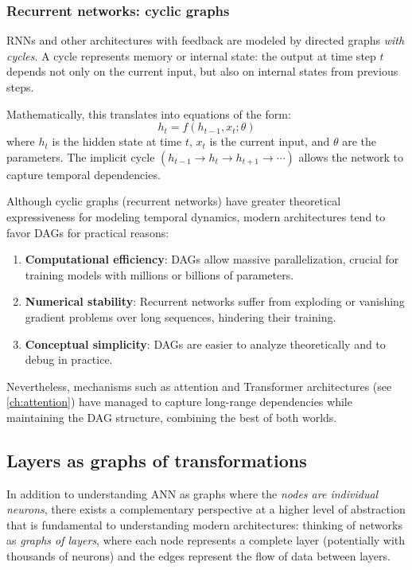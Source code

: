 \subsubsection{Recurrent networks: cyclic graphs}

\glspl{RNN} and other architectures with feedback are modeled by directed graphs \textit{with cycles}. A cycle represents memory or internal state: the output at time step $t$ depends not only on the current input, but also on internal states from previous steps.

Mathematically, this translates into equations of the form:
\[
h_t = f(h_{t-1}, x_t; \theta)
\]
where $h_t$ is the hidden state at time $t$, $x_t$ is the current input, and $\theta$ are the parameters. The implicit cycle $(h_{t-1} \to h_t \to h_{t+1} \to \cdots)$ allows the network to capture temporal dependencies.

Although cyclic graphs (recurrent networks) have greater theoretical expressiveness for modeling temporal dynamics, modern architectures tend to favor \glspl{DAG} for practical reasons:

\begin{enumerate}
    \item \textbf{Computational efficiency}: \glspl{DAG} allow massive parallelization, crucial for training models with millions or billions of parameters.

    \item \textbf{Numerical stability}: Recurrent networks suffer from exploding or vanishing gradient problems over long sequences, hindering their training.

    \item \textbf{Conceptual simplicity}: \glspl{DAG} are easier to analyze theoretically and to debug in practice.
\end{enumerate}

Nevertheless, mechanisms such as attention and \gls{Transformer} architectures (see \autoref{ch:attention}) have managed to capture long-range dependencies while maintaining the \gls{DAG} structure, combining the best of both worlds.

\subsection{Layers as graphs of transformations}\label{subsec:capas_grafos_transformaciones}

In addition to understanding \gls{ANN} as graphs where the \textit{nodes are individual neurons}, there exists a complementary perspective at a higher level of abstraction that is fundamental to understanding modern architectures: thinking of networks as \textit{graphs of layers}, where each node represents a complete layer (potentially with thousands of neurons) and the edges represent the flow of data between layers.

